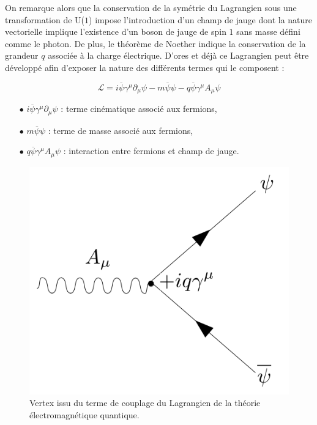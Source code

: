         On remarque alors que la conservation de la symétrie du Lagrangien sous une transformation de U($1$) impose l'introduction d'un champ de jauge dont la nature vectorielle implique l'existence d'un boson de jauge de spin $1$ sans masse défini comme le photon. De plus, le théorème de Noether indique la conservation de la grandeur $q$ associée à la charge électrique. D'ores et déjà ce Lagrangien peut être développé afin d'exposer la nature des différents termes qui le composent :

        \begin{equation}
            \boxed{\mathcal{L}=
            i\overline{\psi}\gamma^{\mu}\partial_{\mu}\psi
            -m\overline{\psi}\psi
            -q\overline{\psi}\gamma^{\mu}A_{\mu}\psi}
        \end{equation}

        \begin{enumerate}
            \item[$\bullet$] $i\overline{\psi}\gamma^{\mu}\partial_{\mu}\psi$ : terme cinématique associé aux fermions,
            \item[$\bullet$] $m\overline{\psi}\psi$ : terme de masse associé aux fermions,
            \item[$\bullet$] $q\overline{\psi}\gamma^{\mu}A_{\mu}\psi$ : interaction entre fermions et champ de jauge. \\
        \end{enumerate}

        \begin{figure}
            \centering
            \includegraphics[scale=0.32]{Chapitre2/Images/psiApsi.png} 
            \caption{Vertex issu du terme de couplage du Lagrangien de la théorie électromagnétique quantique.}
        \label{psiApsi}
        \end{figure}

